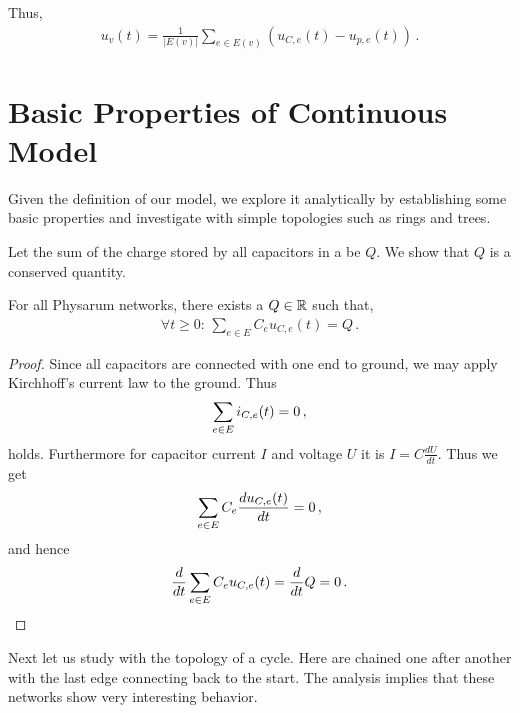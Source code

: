 Thus,
\begin{align}
  u_v(t) = \frac{1}{|E(v)|}\sum_{e \in E(v)}(u_{C,e}(t)-u_{p,e}(t))\,.\label{eq:uv}
\end{align}


\section{Basic Properties of Continuous Model}\label{sec:basic_cont}

  Given the definition of our model, we explore it analytically by establishing some basic properties and investigate \Pns with simple topologies such as rings and trees.

  Let the sum of the charge stored by all capacitors in a \Pn be $Q$. We show that $Q$ is a conserved quantity.

\begin{lem}\label{lem:inv_cont}
For all Physarum networks, there exists a $Q \in \mathbb{R}$ such that,
\begin{align}
\forall t\ge 0:\,\sum_{e \in E}C_e u_{C,e}(t) = Q\,.
\end{align}
\end{lem}

\begin{proof}
Since all capacitors are connected with one end to ground, we may apply Kirchhoff's current law to the ground.
Thus  
\begin{align}
\sum_{e \in E}i_{C,e}(t) = 0\,,\notag
\end{align}
holds. Furthermore for capacitor current $I$ and voltage $U$ it is $I= C \frac{dU}{dt}$. Thus we get
\begin{align}
\sum_{e \in E}C_e\frac{du_{C,e}(t)}{dt} = 0\,,\notag
\end{align}
and hence
\begin{align}
\frac{d}{dt}\sum_{e \in E}C_eu_{C,e}(t) = \frac{d}{dt} Q = 0\,.\notag
\end{align}
\end{proof}

Next let us study \Pns with the topology of a cycle. Here \Pes are chained one after another with the last edge connecting back to the start. The analysis implies that these networks show very interesting behavior. 

